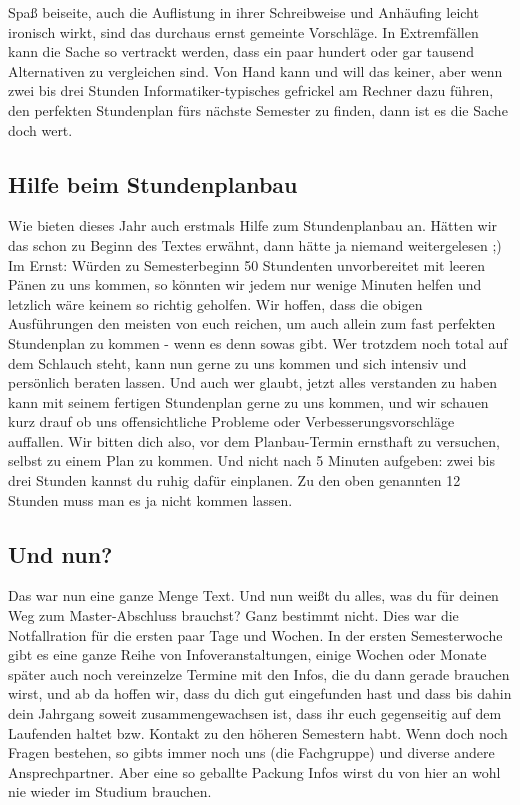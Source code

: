 Spaß beiseite, auch die Auflistung in ihrer Schreibweise und Anhäufing leicht ironisch wirkt, sind das durchaus ernst gemeinte Vorschläge. In Extremfällen kann die Sache so vertrackt werden, dass ein paar hundert oder gar tausend Alternativen zu vergleichen sind. Von Hand kann und will das keiner, aber wenn zwei bis drei Stunden Informatiker-typisches gefrickel am Rechner dazu führen, den perfekten Stundenplan fürs nächste Semester zu finden, dann ist es die Sache doch wert.

\subsection{Hilfe beim Stundenplanbau}
Wie bieten dieses Jahr auch erstmals Hilfe zum Stundenplanbau an. Hätten wir das schon zu Beginn des Textes erwähnt, dann hätte ja niemand weitergelesen ;) Im Ernst: Würden zu Semesterbeginn 50 Stundenten unvorbereitet mit leeren Pänen zu uns kommen, so könnten wir jedem nur wenige Minuten helfen und letzlich wäre keinem so richtig geholfen. Wir hoffen, dass die obigen Ausführungen den meisten von euch reichen, um auch allein zum fast perfekten Stundenplan zu kommen - wenn es denn sowas gibt. Wer trotzdem noch total auf dem Schlauch steht, kann nun gerne zu uns kommen und sich intensiv und persönlich beraten lassen. Und auch wer glaubt, jetzt alles verstanden zu haben kann mit seinem fertigen Stundenplan gerne zu uns kommen, und wir schauen kurz drauf ob uns offensichtliche Probleme oder Verbesserungsvorschläge auffallen. Wir bitten dich also, vor dem Planbau-Termin ernsthaft zu versuchen, selbst zu einem Plan zu kommen. Und nicht nach 5 Minuten aufgeben: zwei bis drei Stunden kannst du ruhig dafür einplanen. Zu den oben genannten 12 Stunden muss man es ja nicht kommen lassen.

\subsection{Und nun?}
Das war nun eine ganze Menge Text. Und nun weißt du alles, was du für deinen Weg zum Master-Abschluss brauchst? Ganz bestimmt nicht. Dies war die Notfallration für die ersten paar Tage und Wochen. In der ersten Semesterwoche gibt es eine ganze Reihe von Infoveranstaltungen, einige Wochen oder Monate später auch noch vereinzelze Termine mit den Infos, die du dann gerade brauchen wirst, und ab da hoffen wir, dass du dich gut eingefunden hast und dass bis dahin dein Jahrgang soweit zusammengewachsen ist, dass ihr euch gegenseitig auf dem Laufenden haltet bzw. Kontakt zu den höheren Semestern habt. Wenn doch noch Fragen bestehen, so gibts immer noch uns (die Fachgruppe) und diverse andere Ansprechpartner. Aber eine so geballte Packung Infos wirst du von hier an wohl nie wieder im Studium brauchen.


